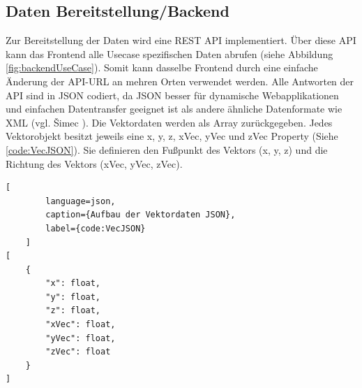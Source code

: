 \subsection{Daten Bereitstellung/Backend}
\label{section:Backend}

Zur Bereitstellung der Daten wird eine REST API implementiert.
Über diese API kann das Frontend alle Usecase spezifischen Daten
abrufen (siehe Abbildung \ref{fig:backendUseCase}). Somit kann dasselbe Frontend durch eine einfache Änderung der API-URL an mehren
Orten verwendet werden. Alle Antworten der API sind in JSON codiert,
da JSON besser für dynamische Webapplikationen und einfachen
Datentransfer geeignet ist als andere ähnliche Datenformate wie
XML (vgl. Šimec \cite{comparisonJsonXml}). Die Vektordaten werden
als Array zurückgegeben. Jedes Vektorobjekt besitzt jeweils eine
x, y, z, xVec, yVec und zVec Property (Siehe \lstlistingname\space \ref{code:VecJSON}).
Sie definieren den Fußpunkt des Vektors (x, y, z) und die Richtung
des Vektors (xVec, yVec, zVec).

\begin{codeblock}
	\begin{lstlisting}[
		language=json,
		caption={Aufbau der Vektordaten JSON},
		label={code:VecJSON}
	]
[
	{
		"x": float,
		"y": float,
		"z": float,
		"xVec": float,
		"yVec": float,
		"zVec": float
	}
]
	\end{lstlisting}
\end{codeblock}

